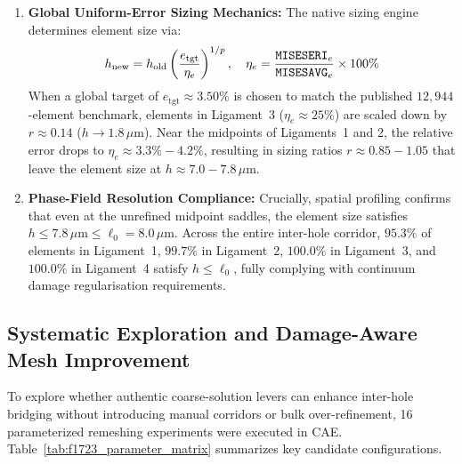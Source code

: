\begin{enumerate}
  \item \textbf{Global Uniform-Error Sizing Mechanics:}
  The native \Abaqus sizing engine determines element size via:
  \begin{equation}
    h_{\mathrm{new}} = h_{\mathrm{old}} \left(\frac{e_{\mathrm{tgt}}}{\eta_e}\right)^{1/p}, \quad \eta_e = \frac{\texttt{MISESERI}_e}{\texttt{MISESAVG}_e} \times 100\%
    \label{eq:f1723_sizing}
  \end{equation}
  When a global target of $e_{\mathrm{tgt}} \approx 3.50\%$ is chosen to match the published $12{,}944$-element benchmark, elements in Ligament~3 ($\eta_e \approx 25\%$) are scaled down by $r \approx 0.14$ ($h \to 1.8\,\mu\mathrm{m}$). Near the midpoints of Ligaments~1 and 2, the relative error drops to $\eta_e \approx 3.3\% - 4.2\%$, resulting in sizing ratios $r \approx 0.85 - 1.05$ that leave the element size at $h \approx 7.0 - 7.8\,\mu\mathrm{m}$.
  
  \item \textbf{Phase-Field Resolution Compliance:}
  Crucially, spatial profiling confirms that even at the unrefined midpoint saddles, the element size satisfies $h \le 7.8\,\mu\mathrm{m} \le \ell_0 = 8.0\,\mu\mathrm{m}$. Across the entire inter-hole corridor, $95.3\%$ of elements in Ligament~1, $99.7\%$ in Ligament~2, $100.0\%$ in Ligament~3, and $100.0\%$ in Ligament~4 satisfy $h \le \ell_0$, fully complying with continuum damage regularisation requirements.
\end{enumerate}

\subsection{Systematic Exploration and Damage-Aware Mesh Improvement}
\label{subsec:f1723_exploration}

To explore whether authentic coarse-solution levers can enhance inter-hole bridging without introducing manual corridors or bulk over-refinement, 16 parameterized remeshing experiments were executed in \Abaqus CAE. Table~\ref{tab:f1723_parameter_matrix} summarizes key candidate configurations.

